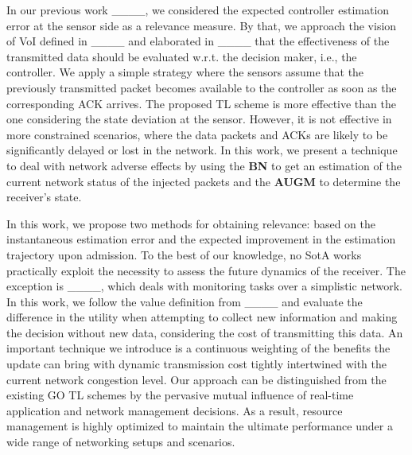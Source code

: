
In our previous work ____, we considered the expected controller estimation error at the sensor side as a relevance measure. By that, we approach the vision of VoI defined in ____ and elaborated in ____ that the effectiveness of the transmitted data should be evaluated w.r.t. the decision maker, i.e., the controller. We apply a simple strategy where the sensors assume that the previously transmitted packet becomes available to the controller as soon as the corresponding ACK arrives. The proposed TL scheme is more effective than the one considering the state deviation at the sensor. However, it is not effective in more constrained scenarios, where the data packets and ACKs are likely to be significantly delayed or lost in the network. In this work, we present a technique to deal with network adverse effects by using the \textbf{BN}  to get an estimation of the current network status of the injected packets and the \textbf{AUGM} to determine the receiver's state. 

In this work, we propose two methods for obtaining relevance: based on the instantaneous estimation error and the expected improvement in the estimation trajectory upon admission. To the best of our knowledge, no SotA works practically exploit the necessity to assess the future dynamics of the receiver. The exception is ____, which deals with monitoring tasks over a simplistic network. In this work, we follow the value definition from ____ and evaluate the difference in the utility when attempting to collect new information and making the decision without new data, considering the cost of transmitting this data. An important technique we introduce is a continuous weighting of the benefits the update can bring with dynamic transmission cost tightly intertwined with the current network congestion level. Our approach can be distinguished from the existing GO TL schemes by the pervasive mutual influence of real-time application and network management decisions. As a result,  resource management is highly optimized to maintain the ultimate performance under a wide range of networking setups and scenarios.